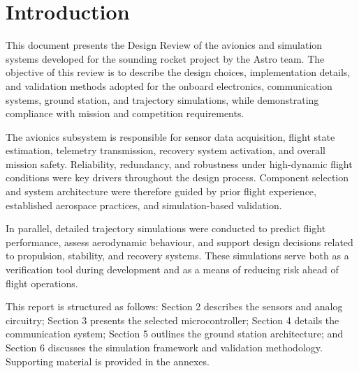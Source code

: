 \section{Introduction}

This document presents the Design Review of the avionics and simulation systems developed for the sounding rocket project by the Astro team. The objective of this review is to describe the design choices, implementation details, and validation methods adopted for the onboard electronics, communication systems, ground station, and trajectory simulations, while demonstrating compliance with mission and competition requirements. 

The avionics subsystem is responsible for sensor data acquisition, flight state estimation, telemetry transmission, recovery system activation, and overall mission safety. Reliability, redundancy, and robustness under high-dynamic flight conditions were key drivers throughout the design process. Component selection and system architecture were therefore guided by prior flight experience, established aerospace practices, and simulation-based validation. 

In parallel, detailed trajectory simulations were conducted to predict flight performance, assess aerodynamic behaviour, and support design decisions related to propulsion, stability, and recovery systems. These simulations serve both as a verification tool during development and as a means of reducing risk ahead of flight operations. 

This report is structured as follows: Section 2 describes the sensors and analog circuitry; Section 3 presents the selected microcontroller; Section 4 details the communication system; Section 5 outlines the ground station architecture; and Section 6 discusses the simulation framework and validation methodology. Supporting material is provided in the annexes. 